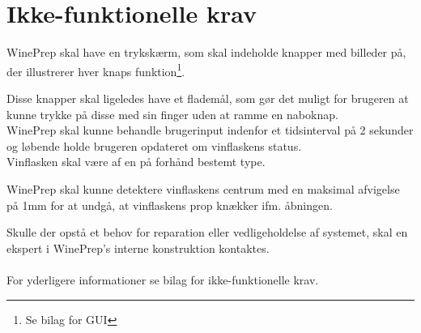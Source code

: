 \section{Ikke-funktionelle krav}
WinePrep skal have en trykskærm, som skal indeholde knapper med billeder på, der illustrerer hver knaps funktion\footnote{Se bilag for GUI}.

Disse knapper skal ligeledes have et flademål, som gør det muligt for brugeren at kunne trykke på disse med sin finger uden at ramme en naboknap. \\

WinePrep skal kunne behandle brugerinput indenfor et tidsinterval på 2 sekunder og løbende holde brugeren opdateret om vinflaskens status. \\

Vinflasken skal være af en på forhånd bestemt type.

WinePrep skal kunne detektere vinflaskens centrum med en maksimal afvigelse på 1mm for at undgå, at vinflaskens prop knækker ifm. åbningen.

Skulle der opstå et behov for reparation eller vedligeholdelse af systemet, skal en ekspert i WinePrep's interne konstruktion kontaktes. \\
\\
For yderligere informationer se bilag for ikke-funktionelle krav.
